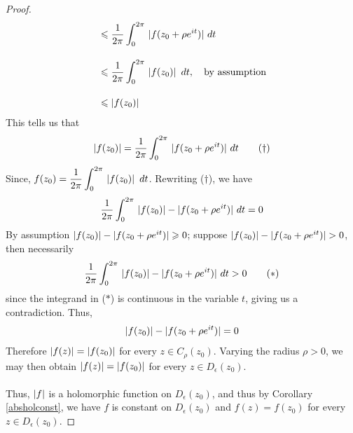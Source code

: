 \begin{proof}
\begin{align*}
 &\leqslant \frac{1}{2\pi}\int_0^{2\pi}\,|f(z_0 + \rho e^{it})|\ dt\\[1em]
 &\leqslant \frac{1}{2\pi}\int_0^{2\pi}\,\left\lvert f(z_0)\right\rvert\ dt,\quad \text{by assumption}\\[1em]
 &\leqslant \left\lvert f(z_0)\right\rvert
\end{align*} 
This tells us that
\[\left\lvert f(z_0)\right\rvert = \frac{1}{2\pi}\int_0^{2\pi}\,|f(z_0 + \rho e^{it})|\ dt \tag{$\dagger$}\]
Since, $\displaystyle f(z_0) =  \frac{1}{2\pi}\int_0^{2\pi}\,\left\lvert f(z_0)\right\rvert\ dt$. Rewriting ($\dagger$), we have
\[\frac{1}{2\pi}\int_0^{2\pi}\, \left\lvert f(z_0)\right\rvert - |f(z_0 + \rho e^{it})|\ dt = 0\]
By assumption $\left\lvert f(z_0)\right\rvert - |f(z_0 + \rho e^{it})| \geqslant 0$; suppose $\left\lvert f(z_0)\right\rvert - |f(z_0 + \rho e^{it})| > 0$, then necessarily 
\[\frac{1}{2\pi}\int_0^{2\pi}\, \left\lvert f(z_0)\right\rvert - |f(z_0 + \rho e^{it})|\ dt > 0\tag{$*$}\]
since the integrand in ($*$) is continuous in the variable $t$, giving us a contradiction. Thus, 
\[\left\lvert f(z_0)\right\rvert - |f(z_0 + \rho e^{it})| = 0\]
Therefore $\left\lvert f(z)\right\rvert = \left\lvert f(z_0)\right\rvert$ for every $z \in C_\rho(z_0)$. Varying the radius $\rho > 0$, we may then obtain $\left\lvert f(z)\right\rvert = \left\lvert f(z_0)\right\rvert$ for every $z \in D_\epsilon(z_0)$.\\
\\
Thus, $\left\lvert f\right\rvert$ is a holomorphic function on $D_\epsilon(z_0)$, and thus by Corollary \ref{absholconst}, we have $f$ is constant on $D_\epsilon(z_0)$ and $f(z) = f(z_0)$ for every $z \in D_\epsilon(z_0)$.
\end{proof}
